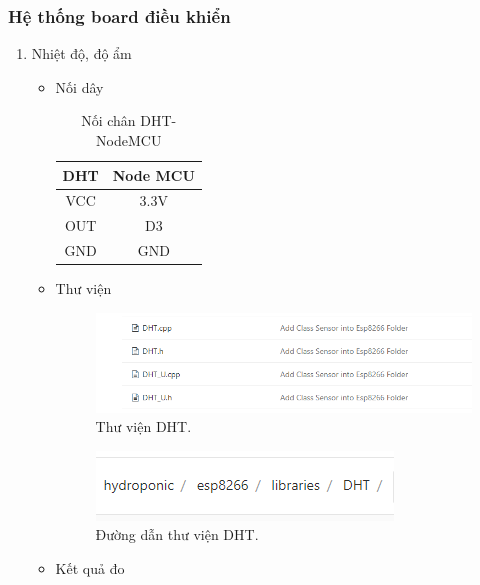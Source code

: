 \documentclass[a4paper,12pt,oneside]{article}
\begin{document}
\subsubsection{Hệ thống board điều khiển}
	\begin{enumerate}
	\item Nhiệt độ, độ ẩm
		\begin{itemize}
			\item Nối dây
			\begin{table}[H]
		    \centering
				\begin{tabular}{|c|c|}
				\hline 
				DHT & Node MCU \\ 
				\hline 
				VCC & 3.3V \\ 
				\hline 
				OUT & D3 \\ 
				\hline 
				GND & GND \\ 
				\hline 
				\end{tabular} 
			\caption{Nối chân DHT-NodeMCU}
			\end{table}
			
			\item Thư viện
			
			\begin{figure}[H]
			\centering
			\begin{center}
			\includegraphics[scale=.7]{hinh/lib_DHT.PNG}
			\end{center}
			\caption{Thư viện DHT.}
			\end{figure}
			
			\begin{figure}[H]
			\centering
			\begin{center}
			\includegraphics[scale=.7]{hinh/path_DHT.PNG}
			\end{center}
			\caption{Đường dẫn thư viện DHT.}
			\end{figure}
			
			\item Kết quả đo
			

\end{itemize}
\end{enumerate}
\end{document}
